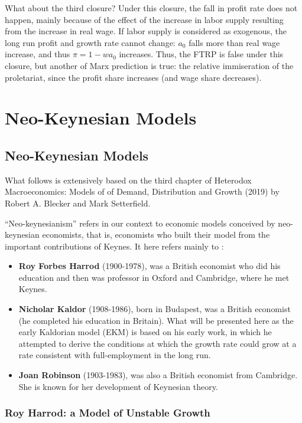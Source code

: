 \documentclass[
  letterpaper,
  DIV=11,
  numbers=noendperiod]{scrreprt}
\begin{document}
What about the third closure? Under this closure, the fall in profit
rate does not happen, mainly because of the effect of the increase in
labor supply resulting from the increase in real wage. If labor supply
is considered as exogenous, the long run profit and growth rate cannot
change: \(a_0\) falls more than real wage increase, and thus
\(\pi = 1-wa_0\) increases. Thus, the FTRP is false under this closure,
but another of Marx prediction is true: the relative immiseration of the
proletariat, since the profit share increases (and wage share
decreases).

\part{Neo-Keynesian Models}

\hypertarget{neo-keynesian-models-1}{%
\chapter{Neo-Keynesian Models}\label{neo-keynesian-models-1}}

What follows is extensively based on the third chapter of Heterodox
Macroeconomics: Models of of Demand, Distribution and Growth (2019) by
Robert A. Blecker and Mark Setterfield.

``Neo-keynesianism'' refers in our context to economic models conceived
by neo-keynesian economists, that is, economists who built their model
from the important contributions of Keynes. It here refers mainly to :

\begin{itemize}
\item
  \textbf{Roy Forbes Harrod} (1900-1978), was a British economist who
  did his education and then was professor in Oxford and Cambridge,
  where he met Keynes.
\item
  \textbf{Nicholar Kaldor} (1908-1986), born in Budapest, was a British
  economist (he completed his education in Britain). What will be
  presented here as the early Kaldorian model (EKM) is based on his
  early work, in which he attempted to derive the conditions at which
  the growth rate could grow at a rate consistent with full-employment
  in the long run.
\item
  \textbf{Joan Robinson} (1903-1983), was also a British economist from
  Cambridge. She is known for her development of Keynesian theory.
\end{itemize}

\hypertarget{roy-harrod-a-model-of-unstable-growth}{%
\section{Roy Harrod: a Model of Unstable
Growth}\label{roy-harrod-a-model-of-unstable-growth}}
\end{document}
